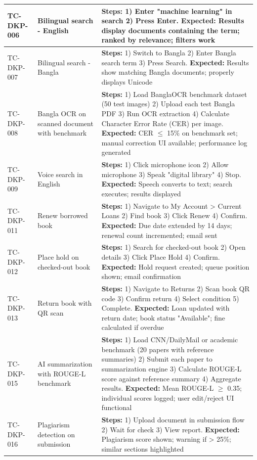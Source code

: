 \documentclass[12pt,a4paper]{report}
\begin{document}
\begin{longtable}{|p{2cm}|p{3cm}|p{8.5cm}|}
TC-DKP-006 & Bilingual search - English & \textbf{Steps:} 1) Enter "machine learning" in search 2) Press Enter. \textbf{Expected:} Results display documents containing the term; ranked by relevance; filters work \\ \hline
TC-DKP-007 & Bilingual search - Bangla & \textbf{Steps:} 1) Switch to Bangla 2) Enter Bangla search term 3) Press Search. \textbf{Expected:} Results show matching Bangla documents; properly displays Unicode \\ \hline
TC-DKP-008 & Bangla OCR on scanned document with benchmark & \textbf{Steps:} 1) Load BanglaOCR benchmark dataset (50 test images) 2) Upload each test Bangla PDF 3) Run OCR extraction 4) Calculate Character Error Rate (CER) per image. \textbf{Expected:} CER $\leq$ 15\% on benchmark set; manual correction UI available; performance log generated \\ \hline
TC-DKP-009 & Voice search in English & \textbf{Steps:} 1) Click microphone icon 2) Allow microphone 3) Speak "digital library" 4) Stop. \textbf{Expected:} Speech converts to text; search executes; results displayed \\ \hline
TC-DKP-011 & Renew borrowed book & \textbf{Steps:} 1) Navigate to My Account > Current Loans 2) Find book 3) Click Renew 4) Confirm. \textbf{Expected:} Due date extended by 14 days; renewal count incremented; email sent \\ \hline
TC-DKP-012 & Place hold on checked-out book & \textbf{Steps:} 1) Search for checked-out book 2) Open details 3) Click Place Hold 4) Confirm. \textbf{Expected:} Hold request created; queue position shown; email confirmation \\ \hline
TC-DKP-013 & Return book with QR scan & \textbf{Steps:} 1) Navigate to Returns 2) Scan book QR code 3) Confirm return 4) Select condition 5) Complete. \textbf{Expected:} Loan updated with return date; book status "Available"; fine calculated if overdue \\ \hline
TC-DKP-015 & AI summarization with ROUGE-L benchmark & \textbf{Steps:} 1) Load CNN/DailyMail or academic benchmark (20 papers with reference summaries) 2) Submit each paper to summarization engine 3) Calculate ROUGE-L score against reference summary 4) Aggregate results. \textbf{Expected:} Mean ROUGE-L $\geq$ 0.35; individual scores logged; user edit/reject UI functional \\ \hline
TC-DKP-016 & Plagiarism detection on submission & \textbf{Steps:} 1) Upload document in submission flow 2) Wait for check 3) View report. \textbf{Expected:} Plagiarism score shown; warning if > 25\%; similar sections highlighted \\ \hline

\end{longtable}
\end{document}
